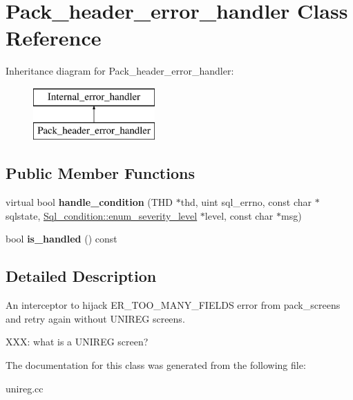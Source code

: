 \hypertarget{classPack__header__error__handler}{}\section{Pack\+\_\+header\+\_\+error\+\_\+handler Class Reference}
\label{classPack__header__error__handler}
Inheritance diagram for Pack\+\_\+header\+\_\+error\+\_\+handler\+:\begin{figure}[H]
\begin{center}
\leavevmode
\includegraphics[height=2.000000cm]{classPack__header__error__handler}
\end{center}
\end{figure}
\subsection*{Public Member Functions}
\begin{DoxyCompactItemize}
\item 
\mbox{\label{classPack__header__error__handler_a9ce51965815b93c2ddcdcd95ac791641}} 
virtual bool {\bfseries handle\+\_\+condition} (T\+HD $\ast$thd, uint sql\+\_\+errno, const char $\ast$sqlstate, \mbox{\hyperlink{classSql__condition_ab0602581e19cddb609bfe10c44be4e83}{Sql\+\_\+condition\+::enum\+\_\+severity\+\_\+level}} $\ast$level, const char $\ast$msg)
\item 
\mbox{\label{classPack__header__error__handler_a47031519734ea75b0cd0e426d546d2b4}} 
bool {\bfseries is\+\_\+handled} () const
\end{DoxyCompactItemize}


\subsection{Detailed Description}
An interceptor to hijack E\+R\+\_\+\+T\+O\+O\+\_\+\+M\+A\+N\+Y\+\_\+\+F\+I\+E\+L\+DS error from pack\+\_\+screens and retry again without U\+N\+I\+R\+EG screens.

X\+XX\+: what is a U\+N\+I\+R\+EG screen? 

The documentation for this class was generated from the following file\+:\begin{DoxyCompactItemize}
\item 
unireg.\+cc\end{DoxyCompactItemize}
